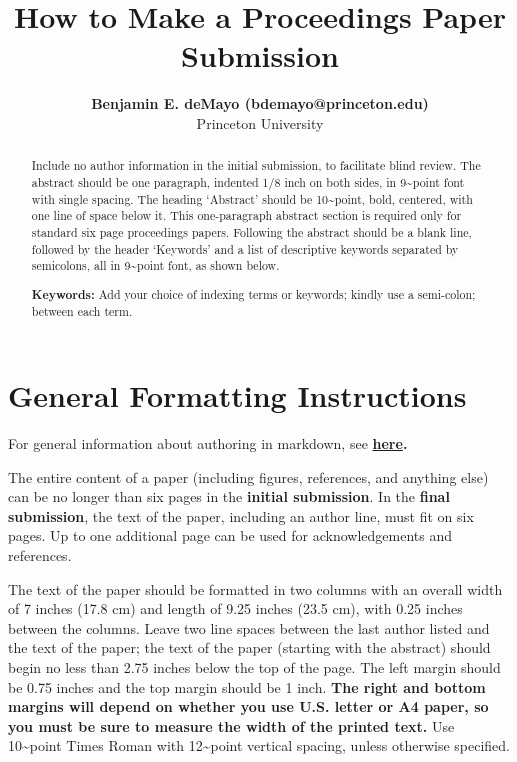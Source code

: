 \documentclass[10pt, letterpaper]{article}
\title{How to Make a Proceedings Paper Submission}
\author{{\large \bf Benjamin E. deMayo (bdemayo@princeton.edu)} \\ Princeton University}
\begin{document}
\maketitle

\begin{abstract}
Include no author information in the initial submission, to facilitate
blind review. The abstract should be one paragraph, indented 1/8 inch on
both sides, in 9\textasciitilde point font with single spacing. The
heading `Abstract' should be 10\textasciitilde point, bold, centered,
with one line of space below it. This one-paragraph abstract section is
required only for standard six page proceedings papers. Following the
abstract should be a blank line, followed by the header `Keywords' and a
list of descriptive keywords separated by semicolons, all in
9\textasciitilde point font, as shown below.

\textbf{Keywords:}
Add your choice of indexing terms or keywords; kindly use a semi-colon;
between each term.
\end{abstract}

\hypertarget{general-formatting-instructions}{%
\section{General Formatting
Instructions}\label{general-formatting-instructions}}

For general information about authoring in markdown, see
\textbf{\href{http://rmarkdown.rstudio.com/authoring_basics.html}{here}.}

The entire content of a paper (including figures, references, and
anything else) can be no longer than six pages in the
\textbf{initial submission}. In the \textbf{final submission}, the text
of the paper, including an author line, must fit on six pages. Up to one
additional page can be used for acknowledgements and references.

The text of the paper should be formatted in two columns with an overall
width of 7 inches (17.8 cm) and length of 9.25 inches (23.5 cm), with
0.25 inches between the columns. Leave two line spaces between the last
author listed and the text of the paper; the text of the paper (starting
with the abstract) should begin no less than 2.75 inches below the top
of the page. The left margin should be 0.75 inches and the top margin
should be 1 inch. \textbf{The right and bottom margins will depend on
whether you use U.S. letter or A4 paper, so you must be sure to
measure the width of the printed text.} Use 10\textasciitilde point
Times Roman with 12\textasciitilde point vertical spacing, unless
otherwise specified.
\end{document}
